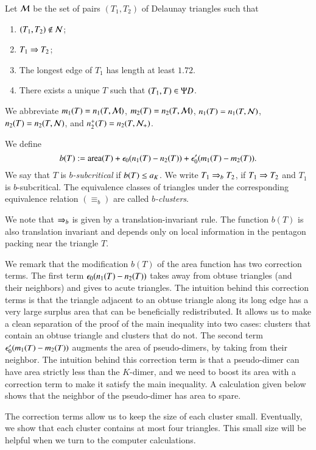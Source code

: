 Let $\mathcal M$ be the set of pairs $(T_1,T_2)$ of Delaunay triangles such that
\begin{enumerate}
\item $(T_1,T_2)\not\in \mathcal N$;
\item $T_1\Rightarrow T_2$;
\item The longest edge of $T_1$ has length  at least $1.72$.
\item There exists a unique $T$ such that $(T_1,T)\in \Psi D$.
\end{enumerate}

We abbreviate $m_1(T) = n_1(T,\mathcal M)$, $m_2(T) = n_2(T,\mathcal M)$, $n_1(T) = n_1(T,\mathcal N)$, $n_2(T) = n_2(T,\mathcal N)$,
and $n_2^+(T) = n_2(T,\mathcal N_+)$.

We define
\[
b(T) := {\operatorname{area}}(T) + \epsilon_0 (n_1(T) - n_2(T)) + \epsilon_0' (m_1(T) - m_2(T)).
\]
We say that $T$ is {\it $b$-subcritical} if $b(T) \le a_K$.  We write
$T_1\Rightarrow_{b} T_2$, if $T_1\Rightarrow T_2$ and $T_1$ is $b$-subcritical.
The equivalence classes of triangles under the corresponding
equivalence relation $(\equiv_b)$ are called {\it $b$-clusters}.

We note that $\Rightarrow_{b}$ is given by a translation-invariant rule.  The function $b(T)$ is also
translation invariant and depends only on local information in the pentagon packing near  the triangle $T$.

We remark that the modification $b(T)$ of the area function has two correction terms.
The first term $\epsilon_0 (n_1(T) - n_2(T))$ takes away from obtuse triangles (and their neighbors) and gives 
 to acute triangles.  
The intuition behind this correction terms is that the triangle adjacent to an obtuse triangle along its long edge
has a very large surplus area that can be beneficially redistributed.  It allows us to make a clean separation of
the proof of the main inequality into two cases: clusters that contain an obtuse triangle and clusters that do not.
The second term $\epsilon_0' (m_1(T) - m_2(T))$ augments the area of pseudo-dimers, by taking from
their neighbor.   The intuition behind this correction term is that a pseudo-dimer can have area strictly less than
the $K$-dimer, and we need to boost its area with a correction term to make it satisfy the main
inequality.  A calculation given below shows that the neighbor of the pseudo-dimer has area to spare.

The correction terms allow us to keep the size of each cluster small.  Eventually, we show that each
cluster contains at most four triangles.  This small size will be helpful when we turn to the computer calculations.


